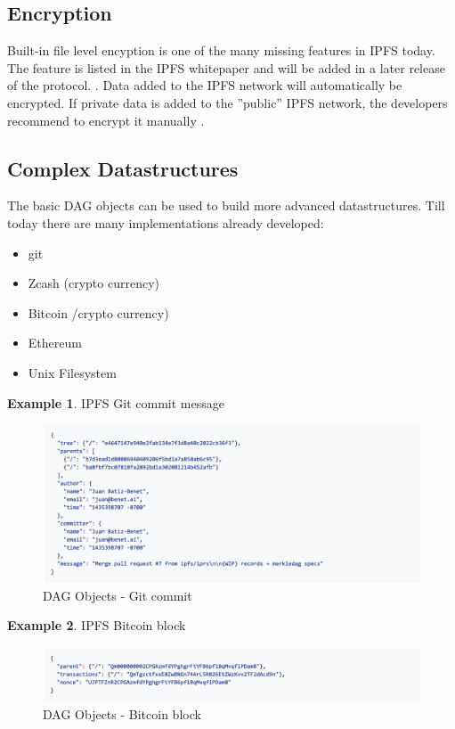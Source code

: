 \documentclass[a4paper,11pt, oneside]{report}
\theoremstyle{definition}
\newtheorem{exmp}{Example}[subsection]
\begin{document}
\subsection{Encryption}
Built-in file level encyption is one of the many missing features in IPFS today. The feature is listed in the IPFS whitepaper and will be added in a later release of the protocol. \cite{Encryption}. Data added to the IPFS network will automatically be encrypted. If private data is added to the ''public'' IPFS network, the developers recommend to encrypt it manually \cite{EncryptionManual}.

\newpage
\subsection{Complex Datastructures}
The basic DAG objects can be used to build more advanced datastructures. Till today there are many implementations already developed:
\begin{itemize}
\item git
\item Zcash (crypto currency)
\item Bitcoin /crypto currency)
\item Ethereum
\item Unix Filesystem
\end{itemize}

\begin{exmp}IPFS Git commit message
\begin{figure}[H]
\centering
\includegraphics[width=\textwidth]{img/dag-object-gitcommit.png}
\caption[DAG Objects commit]{DAG Objects - Git commit}
\end{figure}
\end{exmp}
\begin{exmp}IPFS Bitcoin block
\begin{figure}[H]
\centering
\includegraphics[width=\textwidth]{img/dag-object-blockchain.png}
\caption[DAG Bitcoin block]{DAG Objects - Bitcoin block}
\end{figure}
\end{exmp}
\end{document}
